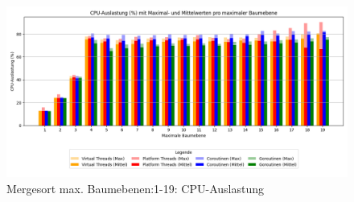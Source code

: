 \documentclass[fontsize=12pt,paper=a4,twoside=semi,parskip=half-,headsepline,headinclude]{scrreprt}
\begin{document}
\begin{figure}[H]
	\centering
	\includegraphics[scale=0.5]{figures/mergesort/Maximalebauebenen1-19_pvcg/cpu_usage_bar_plot.png}
	\caption{Mergesort max. Baumebenen:1-19: CPU-Auslastung}
	\label{fig:ms1-19CPU}
\end{figure}
\end{document}
